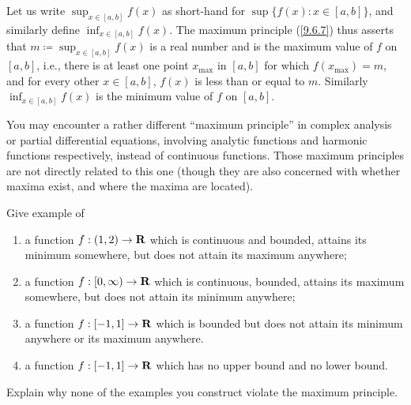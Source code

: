 \begin{note}
  Let us write \(\sup_{x \in [a, b]} f(x)\) as short-hand for \(\sup\{f(x) : x \in [a, b]\}\), and similarly define \(\inf_{x \in [a, b]} f(x)\).
  The maximum principle (\cref{9.6.7}) thus asserts that \(m \coloneqq \sup_{x \in [a, b]} f(x)\) is a real number and is the maximum value of \(f\) on \([a, b]\), i.e., there is at least one point \(x_{\max}\) in \([a, b]\) for which \(f(x_{\max}) = m\), and for every other \(x \in [a, b]\), \(f(x)\) is less than or equal to \(m\).
  Similarly \(\inf_{x \in [a, b]} f(x)\) is the minimum value of \(f\) on \([a, b]\).
\end{note}

\begin{remark}\label{9.6.9}
  You may encounter a rather different ``maximum principle'' in complex analysis or partial differential equations, involving analytic functions and harmonic functions respectively, instead of continuous functions.
  Those maximum principles are not directly related to this one
  (though they are also concerned with whether maxima exist, and where the maxima are located).
\end{remark}

\exercisesection

\begin{exercise}\label{ex 9.6.1}
  Give example of
  \begin{enumerate}
    \item a function \(f : (1, 2) \to \mathbf{R}\) which is continuous and bounded, attains its minimum somewhere, but does not attain its maximum anywhere;
    \item a function \(f : [0, \infty) \to \mathbf{R}\) which is continuous, bounded, attains its maximum somewhere, but does not attain its minimum anywhere;
    \item a function \(f : [-1, 1] \to \mathbf{R}\) which is bounded but does not attain its minimum anywhere or its maximum anywhere.
    \item a function \(f : [-1, 1] \to \mathbf{R}\) which has no upper bound and no lower bound.
  \end{enumerate}
  Explain why none of the examples you construct violate the maximum principle.
\end{exercise}

